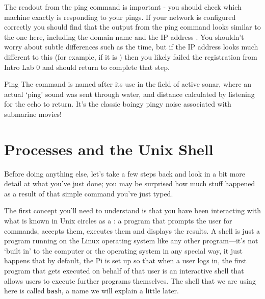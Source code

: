 The readout from the ping command is important - you should check which machine exactly is responding to your pings. If your network is configured correctly you should find that the output from the ping command looks similar to the one here, including the domain name  and the IP address . You shouldn't worry about subtle differences such as the time, but if the IP address looks much different to this (for example, if it is ) then you likely failed the registration from Intro Lab 0 and should return to complete that step.

\begin{diversion}{Ping}
  The  command is named after its use in the field of active sonar, where an actual `ping' sound was sent through water, and distance calculated by listening for the echo to return. It's the classic boingy pingy noise associated with submarine movies!
\end{diversion}

\section{Processes and the Unix Shell}

Before doing anything else, let's take a few steps back and look in a bit more detail at what you've just done; you may be surprised how much stuff happened as a result of that simple command you've just typed.

The first concept you'll need to understand is that you have been
interacting with what is known in Unix circles as a : a program that prompts
the user for commands, accepts them, executes them and displays the
results. A shell is just a program running on the Linux operating system like any other program---it's not `built in' to the computer or the operating system in any special way, it just happens that by default, the Pi is set up so that when a user logs in, the first program that gets executed on behalf of that user is an interactive shell that allows users to execute further programs themselves. The shell that we are using here is called \texttt{bash}, a name we will explain a little later.


